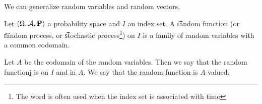 

We can generalize random variables and random vectors.

Let $(\Omega, \mathcal{A}, \mathbf{P})$ a probability space and $I$ an index set.
A \t{random function} (or \t{random process}, or \t{stochastic process}\footnote{The word  is often used when the index set is associated with time}) on $I$ is a family of random variables with a common codomain.

Let $A$ be the codomain of the random variables.
Then we say that the random functionj is on $I$ and in $A$.
We say that the random function is $A$-valued.

\blankpage
